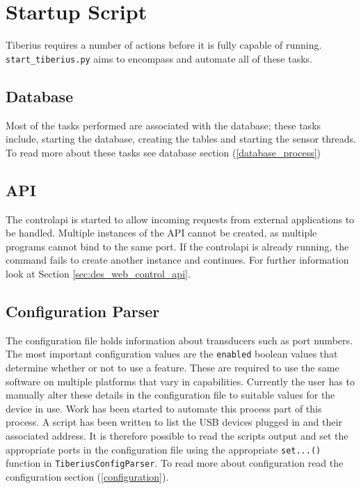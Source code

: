\section{Startup Script}
\pagestyle{aidan}
\label{sec:misc_startup_script} %

Tiberius requires a number of actions before it is fully capable of running. \texttt{start_tiberius.py} aims to encompass and automate all of these tasks. 
\newline
\subsection{Database}
Most of the tasks performed are associated with the database; these tasks include, starting the database, creating the tables and starting the sensor threads. To read more about these tasks see database section (\ref{database_process})

\subsection{API}
The \gls{controlapi} is started to allow incoming requests from external applications to be handled. Multiple instances of the API cannot be created, as multiple programs cannot bind to the same port. If the \gls{controlapi} is already running, the command fails to create another instance and continues. For further information look at Section \ref{sec:des_web_control_api}.

\subsection{Configuration Parser}
The configuration file holds information about transducers such as port numbers. The most important configuration values are the \texttt{enabled} boolean values that determine whether or not to use a feature. These are required to use the same software on multiple platforms that vary in capabilities.  Currently the user has to manually alter these details in the configuration file to suitable values for the device in use. Work has been started to automate this process part of this process. A script has been written to list the USB devices plugged in and their associated address. It is therefore possible to read the scripts output and set the appropriate ports in the configuration file using the appropriate \texttt{set...()} function in \texttt{TiberiusConfigParser}. To read more about configuration read the configuration section (\ref{configuration}).

